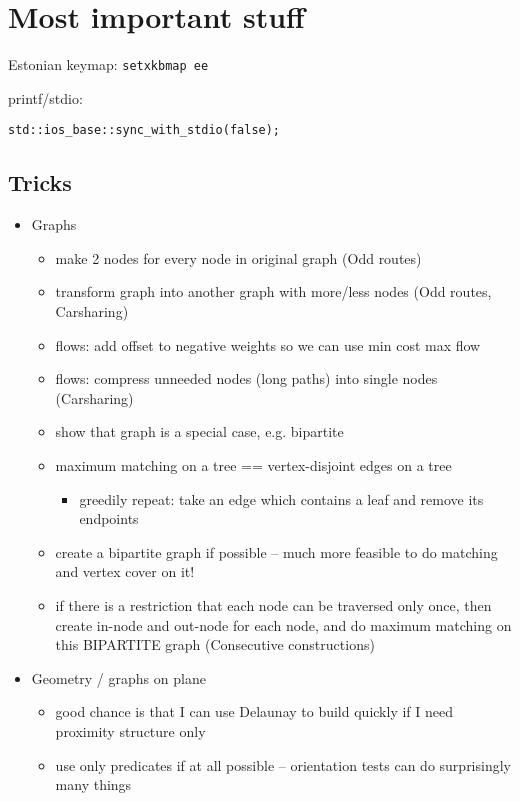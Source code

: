 \documentclass[a4paper,titlepage]{article}
\begin{document}
\section{Most important stuff}

Estonian keymap: \verb+setxkbmap ee+

printf/stdio:
\begin{lstlisting}
std::ios_base::sync_with_stdio(false);
\end{lstlisting}


\subsection{Tricks}
\begin{itemize}
  \item Graphs
    \begin{itemize}
    \item make 2 nodes for every node in original graph (Odd routes)
    \item transform graph into another graph with more/less nodes (Odd routes, Carsharing)
    \item flows: add offset to negative weights so we can use min cost max flow
    \item flows: compress unneeded nodes (long paths) into single nodes (Carsharing)
    \item show that graph is a special case, e.g. bipartite
    \item maximum matching on a tree == vertex-disjoint edges on a tree
      \begin{itemize}
      \item greedily repeat: take an edge which contains a leaf and remove its endpoints 
      \end{itemize}
    \item create a bipartite graph if possible -- much more feasible to do matching and vertex cover on it!
    \item if there is a restriction that each node can be traversed only once, then create in-node and out-node for each node, and do maximum matching on this BIPARTITE graph (Consecutive constructions)
    \end{itemize}
  \item Geometry / graphs on plane
    \begin{itemize} 
    \item good chance is that I can use Delaunay to build quickly if I need proximity structure only
    \item use only predicates if at all possible -- orientation tests can do surprisingly many things

\end{itemize}
\end{itemize}
\end{document}

